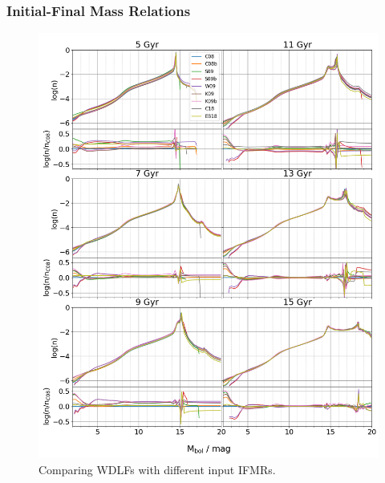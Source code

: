 \documentclass[fleqn,usenatbib]{rasti}
\begin{document}
\subsubsection{Initial-Final Mass Relations}
\begin{figure}
    \centering
    \includegraphics[width=\textwidth]{wdlf_compare_ifmr.png}
    \caption{Comparing WDLFs with different input IFMRs.}
    \label{fig:wdlf_compare_ifmr}
\end{figure}
\end{document}
